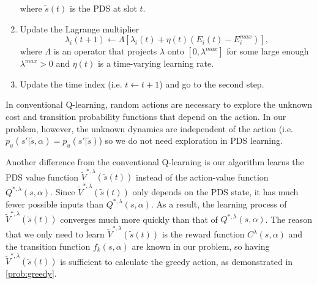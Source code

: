 \documentclass[lettersize, journal]{IEEEtran}
\begin{document}
\begin{enumerate}
        where $\tilde{s}(t)$ is the PDS at slot $t$.
    \item Update the Lagrange multiplier 
        \begin{equation}
            \lambda_i(t+1) \leftarrow \Lambda \left[ \lambda_i(t) + \eta(t) (E_i(t) - E^{max}_i) \right], \label{eq:update_lambda}
        \end{equation}
        where $\Lambda$ is an operator that projects $\lambda$ onto $[0, \lambda^{max}]$ for some large enough $\lambda^{max} > 0$
        and $\eta(t)$ is a time-varying learning rate.
    \item Update the time index (i.e. $t \leftarrow t+1$) and go to the second step.
\end{enumerate}

In conventional Q-learning, random actions are necessary to explore the unknown cost and transition probability functions that depend on the action.
In our problem, however, the unknown dynamics are independent of the action (i.e. $p_u(s'|\tilde{s}, \alpha) = p_u(s'|\tilde{s})$)
so we do not need exploration in PDS learning.

Another difference from the conventional Q-learning is our algorithm learns the PDS value function $\tilde{V}^{*,\lambda}(\tilde{s}(t))$
instead of the action-value function $Q^{*,\lambda}(s, \alpha)$.
Since $\tilde{V}^{*,\lambda}(\tilde{s}(t))$ only depends on the PDS state, it has much fewer
possible inputs than $Q^{*,\lambda}(s,\alpha)$.
As a result, the learning process of $\tilde{V}^{*,\lambda}(\tilde{s}(t))$ converges much more quickly
than that of $Q^{*,\lambda}(s,\alpha)$.
The reason that we only need to learn $\tilde{V}^{*,\lambda}(\tilde{s}(t))$ is the reward function $C^{\lambda}(s,\alpha)$
and the transition function $f_k(s,\alpha)$ are known in our problem, so having $\tilde{V}^{*,\lambda}(\tilde{s}(t))$ is sufficient to
calculate the greedy action, as demonstrated in \eqref{prob:greedy}.
\end{document}
